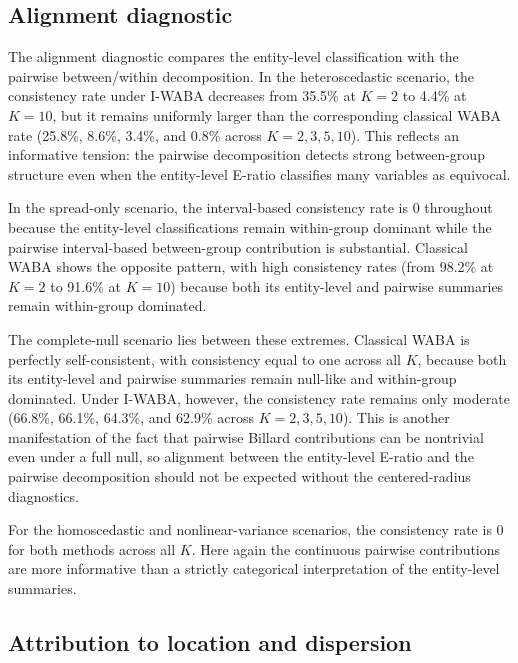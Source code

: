 \documentclass[preprint, times, 12pt, authoryear]{elsarticle}
\begin{document}
\subsection{Alignment diagnostic}

The alignment diagnostic compares the entity-level classification with the pairwise between/within decomposition. In the heteroscedastic scenario, the consistency rate under I-WABA decreases from 35.5\% at $K=2$ to 4.4\% at $K=10$, but it remains uniformly larger than the corresponding classical WABA rate (25.8\%, 8.6\%, 3.4\%, and 0.8\% across $K=2,3,5,10$). This reflects an informative tension: the pairwise decomposition detects strong between-group structure even when the entity-level E-ratio classifies many variables as equivocal.

In the spread-only scenario, the interval-based consistency rate is 0 throughout because the entity-level classifications remain within-group dominant while the pairwise interval-based between-group contribution is substantial. Classical WABA shows the opposite pattern, with high consistency rates (from 98.2\% at $K=2$ to 91.6\% at $K=10$) because both its entity-level and pairwise summaries remain within-group dominated.

The complete-null scenario lies between these extremes. Classical WABA is perfectly self-consistent, with consistency equal to one across all $K$, because both its entity-level and pairwise summaries remain null-like and within-group dominated. Under I-WABA, however, the consistency rate remains only moderate (66.8\%, 66.1\%, 64.3\%, and 62.9\% across $K=2,3,5,10$). This is another manifestation of the fact that pairwise Billard contributions can be nontrivial even under a full null, so alignment between the entity-level E-ratio and the pairwise decomposition should not be expected without the centered-radius diagnostics.

For the homoscedastic and nonlinear-variance scenarios, the consistency rate is 0 for both methods across all $K$. Here again the continuous pairwise contributions are more informative than a strictly categorical interpretation of the entity-level summaries.


\subsection{Attribution to location and dispersion}\label{sec:sim_level_iv}
\end{document}
